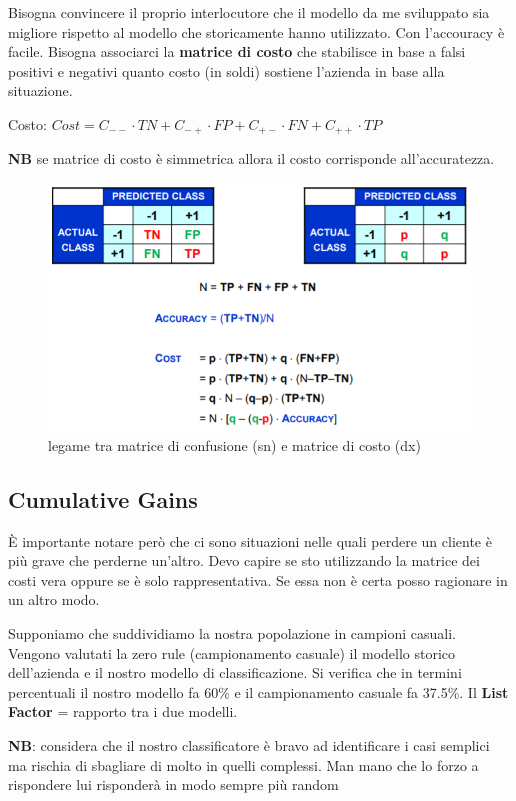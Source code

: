 Bisogna convincere il proprio interlocutore che il modello da me sviluppato sia migliore rispetto al modello che storicamente hanno utilizzato. Con l'accouracy \`e facile. Bisogna associarci la \textbf{matrice di costo} che stabilisce in base a falsi positivi e negativi quanto costo (in soldi) sostiene l'azienda in base alla situazione. 

Costo: $Cost = C_{--} \cdot TN + C_{-+} \cdot FP + C_{+-} \cdot FN + C_{++} \cdot TP$

\textbf{NB} se matrice di costo \`e simmetrica allora il costo corrisponde all'accuratezza.

\begin{figure}[h!]
	\centering
	\includegraphics[height=0.55 \linewidth]{classification/pict/matr_costo.png}
	\caption{legame tra matrice di confusione (sn) e matrice di costo (dx)}
\end{figure}

\subsection{Cumulative Gains}
\`E importante notare per\`o che ci sono situazioni nelle quali perdere un cliente \`e pi\`u grave che perderne un'altro. Devo capire se sto utilizzando la matrice dei costi vera oppure se \`e solo rappresentativa. Se essa non \`e certa posso ragionare in un altro modo. 

Supponiamo che suddividiamo la nostra popolazione in campioni casuali. Vengono valutati la zero rule (campionamento casuale) il modello storico dell'azienda e il nostro modello di classificazione. Si verifica che in termini percentuali il nostro modello fa 60\% e il campionamento casuale fa 37.5\%. 
Il \textbf{List Factor} = rapporto tra i due modelli. 

\textbf{NB}: considera che il nostro classificatore \`e bravo ad identificare i casi semplici ma rischia di sbagliare di molto in quelli complessi. Man mano che lo forzo a rispondere lui risponder\`a in modo sempre pi\`u random

